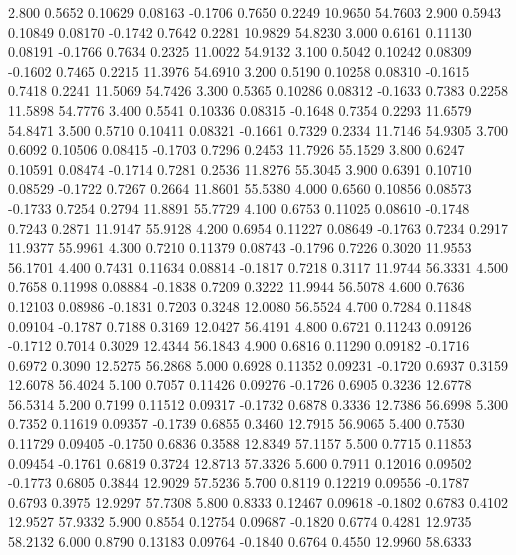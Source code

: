    2.800   0.5652   0.10629   0.08163  -0.1706   0.7650   0.2249  10.9650  54.7603
   2.900   0.5943   0.10849   0.08170  -0.1742   0.7642   0.2281  10.9829  54.8230
   3.000   0.6161   0.11130   0.08191  -0.1766   0.7634   0.2325  11.0022  54.9132
   3.100   0.5042   0.10242   0.08309  -0.1602   0.7465   0.2215  11.3976  54.6910
   3.200   0.5190   0.10258   0.08310  -0.1615   0.7418   0.2241  11.5069  54.7426
   3.300   0.5365   0.10286   0.08312  -0.1633   0.7383   0.2258  11.5898  54.7776
   3.400   0.5541   0.10336   0.08315  -0.1648   0.7354   0.2293  11.6579  54.8471
   3.500   0.5710   0.10411   0.08321  -0.1661   0.7329   0.2334  11.7146  54.9305
   3.700   0.6092   0.10506   0.08415  -0.1703   0.7296   0.2453  11.7926  55.1529
   3.800   0.6247   0.10591   0.08474  -0.1714   0.7281   0.2536  11.8276  55.3045
   3.900   0.6391   0.10710   0.08529  -0.1722   0.7267   0.2664  11.8601  55.5380
   4.000   0.6560   0.10856   0.08573  -0.1733   0.7254   0.2794  11.8891  55.7729
   4.100   0.6753   0.11025   0.08610  -0.1748   0.7243   0.2871  11.9147  55.9128
   4.200   0.6954   0.11227   0.08649  -0.1763   0.7234   0.2917  11.9377  55.9961
   4.300   0.7210   0.11379   0.08743  -0.1796   0.7226   0.3020  11.9553  56.1701
   4.400   0.7431   0.11634   0.08814  -0.1817   0.7218   0.3117  11.9744  56.3331
   4.500   0.7658   0.11998   0.08884  -0.1838   0.7209   0.3222  11.9944  56.5078
   4.600   0.7636   0.12103   0.08986  -0.1831   0.7203   0.3248  12.0080  56.5524
   4.700   0.7284   0.11848   0.09104  -0.1787   0.7188   0.3169  12.0427  56.4191
   4.800   0.6721   0.11243   0.09126  -0.1712   0.7014   0.3029  12.4344  56.1843
   4.900   0.6816   0.11290   0.09182  -0.1716   0.6972   0.3090  12.5275  56.2868
   5.000   0.6928   0.11352   0.09231  -0.1720   0.6937   0.3159  12.6078  56.4024
   5.100   0.7057   0.11426   0.09276  -0.1726   0.6905   0.3236  12.6778  56.5314
   5.200   0.7199   0.11512   0.09317  -0.1732   0.6878   0.3336  12.7386  56.6998
   5.300   0.7352   0.11619   0.09357  -0.1739   0.6855   0.3460  12.7915  56.9065
   5.400   0.7530   0.11729   0.09405  -0.1750   0.6836   0.3588  12.8349  57.1157
   5.500   0.7715   0.11853   0.09454  -0.1761   0.6819   0.3724  12.8713  57.3326
   5.600   0.7911   0.12016   0.09502  -0.1773   0.6805   0.3844  12.9029  57.5236
   5.700   0.8119   0.12219   0.09556  -0.1787   0.6793   0.3975  12.9297  57.7308
   5.800   0.8333   0.12467   0.09618  -0.1802   0.6783   0.4102  12.9527  57.9332
   5.900   0.8554   0.12754   0.09687  -0.1820   0.6774   0.4281  12.9735  58.2132
   6.000   0.8790   0.13183   0.09764  -0.1840   0.6764   0.4550  12.9960  58.6333
